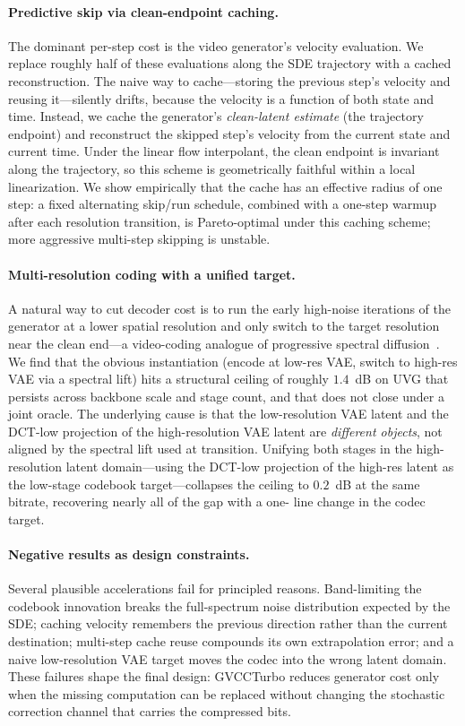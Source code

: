 \paragraph{Predictive skip via clean-endpoint caching.}
The dominant per-step cost is the video generator's velocity evaluation.
We replace roughly half of these evaluations along the SDE trajectory with a
cached reconstruction. The naive way to cache---storing the previous step's
velocity and reusing it---silently drifts, because the velocity is a function
of both state and time. Instead, we cache the generator's
\emph{clean-latent estimate} (the trajectory endpoint) and reconstruct the
skipped step's velocity from the current state and current time. Under the
linear flow interpolant, the clean endpoint is invariant along the trajectory,
so this scheme is geometrically faithful within a local linearization. We show
empirically that the cache has an effective radius of one step: a fixed
alternating skip/run schedule, combined with a one-step warmup after each
resolution transition, is Pareto-optimal under this caching scheme; more
aggressive multi-step skipping is unstable.

\paragraph{Multi-resolution coding with a unified target.}
A natural way to cut decoder cost is to run the early high-noise iterations
of the generator at a lower spatial resolution and only switch to the
target resolution near the clean end---a video-coding analogue of progressive
spectral diffusion~\cite{xiao2026spd}. We find that the obvious instantiation
(encode at low-res VAE, switch to high-res VAE via a spectral lift) hits a
structural ceiling of roughly $1.4$~dB on UVG that persists across backbone
scale and stage count, and that does not close under a joint oracle. The
underlying cause is that the low-resolution VAE latent and the DCT-low
projection of the high-resolution VAE latent are \emph{different objects},
not aligned by the spectral lift used at transition. Unifying both stages
in the high-resolution latent domain---using the DCT-low projection of the
high-res latent as the low-stage codebook target---collapses the ceiling to
$0.2$~dB at the same bitrate, recovering nearly all of the gap with a one-
line change in the codec target.

\paragraph{Negative results as design constraints.}
Several plausible accelerations fail for principled reasons. Band-limiting
the codebook innovation breaks the full-spectrum noise distribution expected
by the SDE; caching velocity remembers the previous direction rather than the
current destination; multi-step cache reuse compounds its own extrapolation
error; and a naive low-resolution VAE target moves the codec into the wrong
latent domain. These failures shape the final design: GVCCTurbo reduces
generator cost only when the missing computation can be replaced without
changing the stochastic correction channel that carries the compressed bits.

